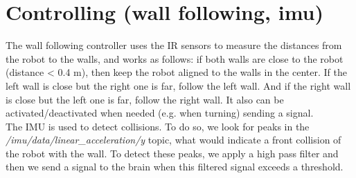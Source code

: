 \documentclass[a4paper, 11pt]{article} %
\begin{document}

\section*{Controlling (wall following, imu)}
\hspace{10 mm}The wall following controller uses the IR sensors to measure the distances from the robot to the walls, and works as follows: if both walls are close to the robot (distance < 0.4 m), then keep the robot aligned to the walls in the center.
If the left wall is close but the right one is far, follow the left wall.
And if the right wall is close but the left one is far, follow the right wall.
It also can be activated/deactivated when needed (e.g. when turning) sending a signal.\\

\hspace{10 mm}The IMU is used to detect collisions. 
To do so, we look for peaks in the \textit{/imu/data/linear\_acceleration/y} topic, what would indicate a front collision of the robot with the wall.
To detect these peaks, we apply a high pass filter and then we send a signal to the brain when this filtered signal exceeds a threshold.











\end{document}
